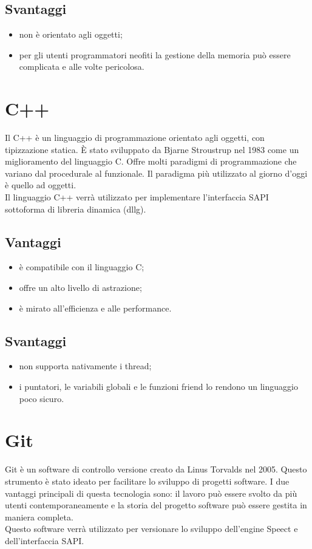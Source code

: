 \subsection*{Svantaggi}
\begin{itemize}
	\item non è orientato agli oggetti;
	\item per gli utenti programmatori neofiti la gestione della memoria può essere complicata e alle volte pericolosa.
\end{itemize}
\section{C++}
Il C++ è un linguaggio di programmazione orientato agli oggetti, con tipizzazione statica. È stato sviluppato da Bjarne Stroustrup nel 1983 come un miglioramento del linguaggio C.
Offre molti paradigmi di programmazione che variano dal procedurale al funzionale.
Il paradigma più utilizzato al giorno d'oggi è quello ad oggetti.\\
Il linguaggio C++ verrà utilizzato per implementare l'interfaccia SAPI sottoforma di libreria dinamica (\gls{dllg}).
\subsection*{Vantaggi}
\begin{itemize}
	\item è compatibile con il linguaggio C;
	\item offre un alto livello di astrazione;
	\item è mirato all'efficienza e alle performance.
\end{itemize}
\subsection*{Svantaggi}
\begin{itemize}
	\item non supporta nativamente i thread;
	\item i puntatori, le variabili globali e le funzioni friend lo rendono un linguaggio poco sicuro.
\end{itemize}
\section{Git}
Git è un software di controllo versione creato da Linus Torvalds nel 2005. Questo strumento è stato ideato per facilitare lo sviluppo di progetti software. I due vantaggi principali di questa tecnologia sono: il lavoro può essere svolto da più utenti contemporaneamente e la storia del progetto software può essere gestita in maniera completa.\\
Questo software verrà utilizzato per versionare lo sviluppo dell'engine Speect e dell'interfaccia SAPI.
